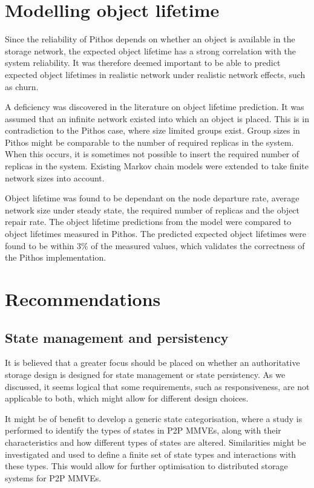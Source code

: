 \section{Modelling object lifetime}

Since the reliability of Pithos depends on whether an object is available in the storage network, the expected object lifetime has a strong correlation with the system reliability. It was therefore deemed important to be able to predict expected object lifetimes in realistic network under realistic network effects, such as churn.

A deficiency was discovered in the literature on object lifetime prediction. It was assumed that an infinite network existed into which an object is placed. This is in contradiction to the Pithos case, where size limited groups exist. Group sizes in Pithos might be comparable to the number of required replicas in the system. When this occurs, it is sometimes not possible to insert the required number of replicas in the system. Existing Markov chain models were extended to take finite network sizes into account.

Object lifetime was found to be dependant on the node departure rate, average network size under steady state, the required number of replicas and the object repair rate. The object lifetime predictions from the model were compared to object lifetimes measured in Pithos. The predicted expected object lifetimes were found to be within 3\% of the measured values, which validates the correctness of the Pithos implementation.

\section{Recommendations}

\subsection{State management and persistency}
It is believed that a greater focus should be placed on whether an authoritative storage design is designed for state management or state persistency. As we discussed, it seems logical that some requirements, such as responsiveness, are not applicable to both, which might allow for different design choices.

It might be of benefit to develop a generic state categorisation, where a study is performed to identify the types of states in P2P MMVEs, along with their characteristics and how different types of states are altered. Similarities might be investigated and used to define a finite set of state types and interactions with these types. This would allow for further optimisation to distributed storage systems for P2P MMVEs.


